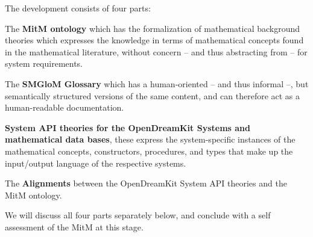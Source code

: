 The development consists of four parts:
\begin{compactenum}[\em i\rm)]
\item The \textbf{MitM ontology} which has the formalization of mathematical background theories
  which expresses the knowledge in terms of mathematical concepts found in the
  mathematical literature, without concern -- and thus abstracting from -- for system
  requirements.
\item The \textbf{SMGloM Glossary} which has a human-oriented -- and thus informal --, but
  semantically structured versions of the same content, and can therefore act as a
  human-readable documentation.
\item \textbf{System API theories for the OpenDreamKit Systems and mathematical data bases}, these
  express the system-specific instances of the mathematical concepts, constructors,
  procedures, and types that make up the input/output language of the respective systems.
\item The \textbf{Alignments} between the OpenDreamKit System API theories and the MitM ontology. 
\end{compactenum}
We will discuss all four parts separately below, and conclude with a self assessment of the MitM at this stage.



